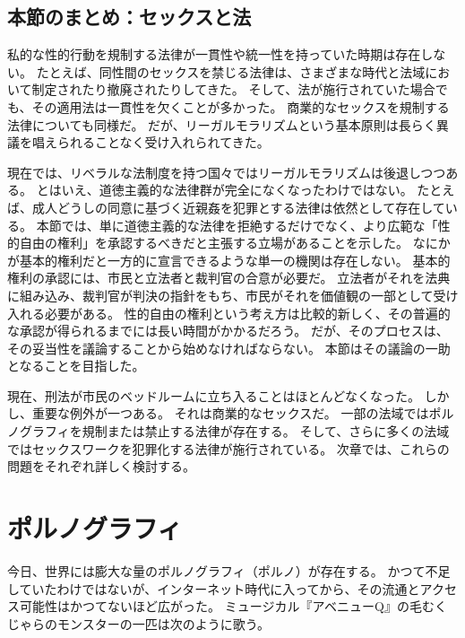 \documentclass[paper=a4,book,openany]{jlreq}
\begin{document}
\subsection{本節のまとめ：セックスと法}

私的な性的行動を規制する法律が一貫性や統一性を持っていた時期は存在しない。
たとえば、同性間のセックスを禁じる法律は、さまざまな時代と法域において制定されたり撤廃されたりしてきた。
そして、法が施行されていた場合でも、その適用法は一貫性を欠くことが多かった。
商業的なセックスを規制する法律についても同様だ。
だが、リーガルモラリズムという基本原則は長らく異議を唱えられることなく受け入れられてきた。

現在では、リベラルな法制度を持つ国々ではリーガルモラリズムは後退しつつある。
とはいえ、道徳主義的な法律群が完全になくなったわけではない。
たとえば、成人どうしの同意に基づく近親姦を犯罪とする法律は依然として存在している。
本節では、単に道徳主義的な法律を拒絶するだけでなく、より広範な「性的自由の権利」を承認するべきだと主張する立場があることを示した。
なにかが基本的権利だと一方的に宣言できるような単一の機関は存在しない。
基本的権利の承認には、市民と立法者と裁判官の合意が必要だ。
立法者がそれを法典に組み込み、裁判官が判決の指針をもち、市民がそれを価値観の一部として受け入れる必要がある。
性的自由の権利という考え方は比較的新しく、その普遍的な承認が得られるまでには長い時間がかかるだろう。
だが、そのプロセスは、その妥当性を議論することから始めなければならない。
本節はその議論の一助となることを目指した。

現在、刑法が市民のベッドルームに立ち入ることはほとんどなくなった。
しかし、重要な例外が一つある。
それは商業的なセックスだ。
一部の法域ではポルノグラフィを規制または禁止する法律が存在する。
そして、さらに多くの法域ではセックスワークを犯罪化する法律が施行されている。
次章では、これらの問題をそれぞれ詳しく検討する。

\section{ポルノグラフィ}

今日、世界には膨大な量のポルノグラフィ（ポルノ）が存在する。
かつて不足していたわけではないが、インターネット時代に入ってから、その流通とアクセス可能性はかつてないほど広がった。
ミュージカル『アベニューQ』の毛むくじゃらのモンスターの一匹は次のように歌う\citep{dabruzzo03:_inter_is_porn}。
\end{document}
